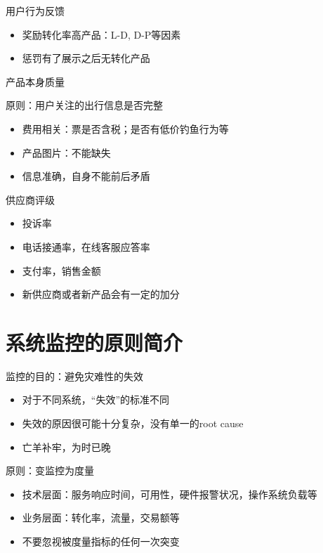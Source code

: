 \documentclass{beamer}
\begin{document}
\begin{CJK}{UTF8}{gbsn}
\begin{frame}{用户行为反馈}
  \begin{itemize}
  \item {奖励转化率高产品：L-D, D-P等因素}
  \item {惩罚有了展示之后无转化产品}
  \end{itemize}
\end{frame}

\begin{frame}{产品本身质量}
  \begin{block}{原则：用户关注的出行信息是否完整}
    \begin{itemize}
    \item {费用相关：票是否含税；是否有低价钓鱼行为等}
    \item {产品图片：不能缺失}
    \item {信息准确，自身不能前后矛盾}
    \end{itemize}
  \end{block}
  
\end{frame}

\begin{frame}{供应商评级}
  \begin{itemize}
  \item {投诉率}
  \item {电话接通率，在线客服应答率}
  \item {支付率，销售金额}
  \item {新供应商或者新产品会有一定的加分}
  \end {itemize}
\end{frame}

\section{系统监控的原则简介}

\begin{frame}{监控的目的：避免灾难性的失效}
  \begin{itemize}
  \item {对于不同系统，“失效”的标准不同}
  \item {失效的原因很可能十分复杂，没有单一的root cause}
  \item {亡羊补牢，为时已晚}
  \end{itemize}
\end{frame}

\begin{frame}{原则：变监控为度量}
  \begin{itemize}
  \item {技术层面：服务响应时间，可用性，硬件报警状况，操作系统负载等}
  \item {业务层面：转化率，流量，交易额等}
  \item {不要忽视被度量指标的任何一次突变}
  \end{itemize}
\end{frame}

\end{CJK}
\end{document}
